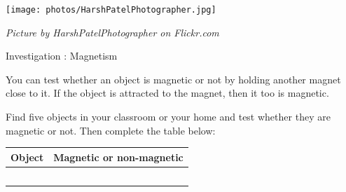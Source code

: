\begin{minipage}{.5\textwidth}
\begin{center}
 \texttt{[image: photos/HarshPatelPhotographer.jpg]}\par
\textit{Picture by HarshPatelPhotographer on Flickr.com}
\end{center}
\end{minipage}
\label{m38706*secfhsst!!!underscore!!!id575}
            \begin{g_experiment}{Investigation : Magnetism}{
            \nopagebreak
      \label{m38706*id67220}You can test whether an object is magnetic or not by holding another magnet close to it. If the object is attracted to the magnet, then it too is magnetic.\par 
      \label{m38706*id67227}Find five objects in your classroom or your home and test whether they are magnetic or not. Then complete the table below:\par 
          \begin{table}[H]
        \begin{center}
      \label{m38706*id67234}
    \noindent
      \begin{tabular}{|l|l|}\hline
                \textbf{Object}
               &
                \textbf{Magnetic or non-magnetic} \\ \hline
         & \\ \hline
         & \\ \hline
         & \\ \hline
         & \\ \hline
         & \\ \hline
    \end{tabular}
      \end{center}
\end{table}}
\end{g_experiment}
    \par
\label{m38706*secfhsst!!!underscore!!!id616}
